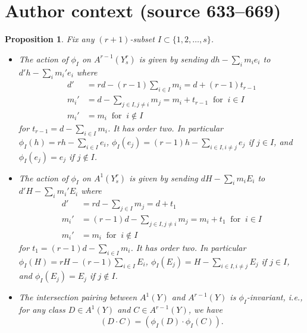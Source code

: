 \documentclass[10pt,a4paper]{amsart}
\newtheorem{proposition}{Proposition}
\begin{document}
\section*{Author context (source 633--669)}
\begin{proposition}\label{CremonaAY}
Fix any $(r+1)$-subset $I \subset \{1,2,\ldots, s\}$.
\begin{itemize}
\item[(a)]
The action of $\phi_I$ on $A^{r-1}(Y^r_s)$ is given by sending $dh-\sum_i m_i e_i$ to $d'h-\sum_i m_i' e_i$ where
\begin{align*}
d' &= rd-(r-1)\sum_{i\in I} m_i =d+(r-1)t_{r-1} \\
m_i' &= d - \sum_{j\in I, j \neq i} m_j = m_i + t_{r-1} \;\;\text{for}\;\; i \in I \\
m_i' &= m_i \;\;\text{for}\;\; i \notin I
\end{align*}
for $t_{r-1} = d - \sum_{i \in I} m_i$.  It has order two.
In particular
$\phi_I(h) = rh-\sum_{i\in I} e_i$,
$\phi_I(e_j) = (r-1)h-\sum_{i\in I, i\neq j} e_j$ if $j\in I$,
and $\phi_I(e_j) = e_j$ if $j \notin I$.

\item[(b)]
The action of $\phi_I$ on $A^1(Y^r_s)$ is given by sending $dH-\sum_i m_i E_i$ to $d'H-\sum_i m_i' E_i$ where
\begin{align*}
d' &= rd - \sum_{j\in I}m_j = d+t_1 \\
m_i' &= (r-1)d - \sum_{j\in I, j\neq i} m_j = m_i + t_1 \;\;\text{for}\;\; i \in I \\
m_i' &= m_i \;\;\text{for}\;\; i \notin I
\end{align*}
for $t_1 = (r-1)d - \sum_{i \in I} m_i$.  It has order two.
In particular
$\phi_I(H) = rH-(r-1)\sum_{i\in I} E_i$,
$\phi_I(E_j) = H-\sum_{i\in I, i\neq j} E_j$ if $j\in I$,
and $\phi_I(E_j) = E_j$ if $j \notin I$.

\item[(c)]
The intersection pairing between $A^1(Y)$ and $A^{r-1}(Y)$ is $\phi_I$-invariant, i.e.,
for any class $D \in A^1(Y)$ and $C \in A^{r-1}(Y)$, we have
\[
(D \cdot C) = (\phi_I(D) \cdot \phi_I(C)).
\]
\end{itemize}
\end{proposition}
\end{document}
